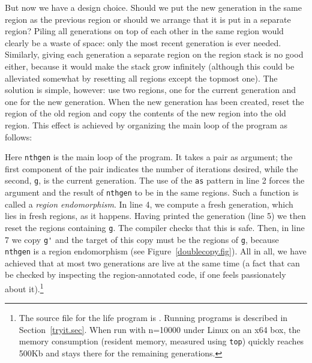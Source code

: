 \documentclass[12pt]{book}
\begin{document}
But now we have a design choice. Should we put the new generation in
the same region as the previous region or should we arrange that it is
put in a separate region? Piling all generations on top of each other
in the same region would clearly be a waste of space: only the most
recent generation is ever needed. Similarly, giving each generation a
separate region on the region stack is no good either, because it
would make the stack grow infinitely (although this could be
alleviated somewhat by resetting all regions except the topmost one).
The solution is simple, however: use two regions, one for the current
generation and one for the new generation. When the new generation has
been created, reset the region of the old region and copy the contents
of the new region into the old region. This effect is achieved by
organizing the main loop of the program as follows:
Here \lstinline{nthgen}
%
%
is the main loop of the program. It takes a pair as argument; the first
component of the pair indicates the number of iterations desired, while the
second, \lstinline{g}, is the current generation. The use of the \lstinline{as}
pattern in line 2 forces the argument and the result of \lstinline{nthgen} to be in
the same regions. Such a function is called a
%
%
{\em region endomorphism}. In line 4, we compute a fresh generation, which lies
in fresh regions, as it happens. Having printed the generation (line 5) we then
reset the regions containing \lstinline{g}. The compiler checks that this is
safe. Then, in line 7 we copy \lstinline{g'} and the target of this copy must be
the regions of \lstinline{g}, because \lstinline{nthgen} is a region
endomorphism (see Figure~\ref{doublecopy.fig}).  All in all, we have achieved
that at most two generations are live at the same time (a fact that can be
checked by inspecting the region-annotated code, if one feels passionately about
it).\footnote{The source file for the life program is
. Running programs is described in
Section~\ref{tryit.sec}. When run with n=10000 under Linux on an x64 box, the
memory consumption (resident memory, measured using \lstinline{top}) quickly
reaches 500Kb and stays there for the remaining generations.}
\end{document}
